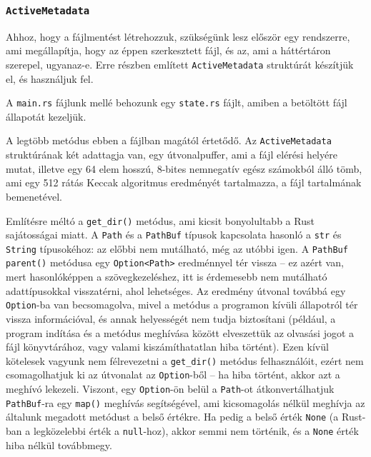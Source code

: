 \subsubsection{\texttt{ActiveMetadata}}

Ahhoz, hogy a fájlmentést létrehozzuk, szükségünk lesz először egy rendszerre, ami megállapítja,
hogy az éppen szerkesztett fájl, és az, ami a háttértáron szerepel, ugyanaz-e.
Erre  részben említett \texttt{ActiveMetadata} struktúrát készítjük el,
és használjuk fel.

A \texttt{main.rs} fájlunk mellé behozunk egy \texttt{state.rs} fájlt, amiben a betöltött
fájl állapotát kezeljük.



A legtöbb metódus ebben a fájlban magától értetődő.
Az \texttt{ActiveMetadata} struktúrának két adattagja van, egy útvonalpuffer,
ami a fájl elérési helyére mutat, illetve egy 64 elem hosszú, 8-bites nemnegatív egész számokból álló tömb,
ami egy 512 rátás Keccak algoritmus eredményét tartalmazza, a fájl tartalmának bemenetével.

Említésre méltó a \verb+get_dir()+ metódus, ami kicsit bonyolultabb a Rust sajátosságai miatt.
A \texttt{Path} és a \texttt{PathBuf} típusok kapcsolata hasonló a \texttt{str} és \texttt{String}
típusokéhoz: az előbbi nem mutálható, még az utóbbi igen.
A \texttt{PathBuf} \texttt{parent()} metódusa egy \texttt{Option<Path>} eredménnyel tér vissza --
ez azért van, mert hasonlóképpen a szövegkezeléshez, itt is érdemesebb nem mutálható adattípusokkal
visszatérni, ahol lehetséges.
Az eredmény útvonal továbbá egy \texttt{Option}-ba van becsomagolva, mivel a metódus a programon
kívüli állapotról tér vissza információval, és annak helyességét nem tudja biztosítani
(például, a program indítása és a metódus meghívása között elveszettük az olvasási jogot a fájl
könyvtárához, vagy valami kiszámíthatatlan hiba történt).
Ezen kívül kötelesek vagyunk nem félrevezetni a \verb+get_dir()+ metódus felhasználóit,
ezért nem csomagolhatjuk ki az útvonalat az \texttt{Option}-ből --
ha hiba történt, akkor azt a meghívó lekezeli.
Viszont, egy \texttt{Option}-ön belül a \texttt{Path}-ot átkonvertálhatjuk \texttt{PathBuf}-ra 
egy \texttt{map()} meghívás segítségével, ami kicsomagolás nélkül meghívja az általunk megadott
metódust a belső értékre.
Ha pedig a belső érték \texttt{None} (a Rust-ban a legközelebbi érték a \texttt{null}-hoz),
akkor semmi nem történik, és a \texttt{None} érték hiba nélkül továbbmegy.

